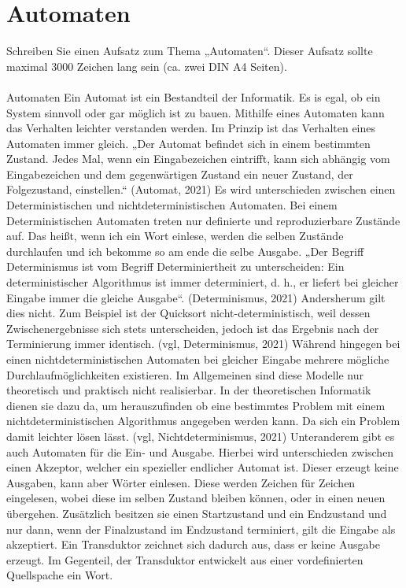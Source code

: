 \section{Automaten}
Schreiben Sie einen Aufsatz zum Thema „Automaten“. Dieser Aufsatz sollte maximal 3000 Zeichen lang sein (ca. zwei DIN A4 Seiten).\\
\\
Automaten
Ein Automat ist ein Bestandteil der Informatik. Es is egal, ob ein System sinnvoll oder gar möglich ist zu bauen. Mithilfe eines Automaten kann das Verhalten leichter verstanden werden. Im Prinzip ist das Verhalten eines Automaten immer gleich. „Der Automat befindet sich in einem bestimmten Zustand. Jedes Mal, wenn ein Eingabezeichen eintrifft, kann sich abhängig vom Eingabezeichen und dem gegenwärtigen Zustand ein neuer Zustand, der Folgezustand, einstellen.“ (Automat, 2021)
Es wird unterschieden zwischen einen Deterministischen und nichtdeterministischen Automaten. Bei einem  Deterministischen Automaten treten nur definierte und reproduzierbare Zustände auf. Das heißt, wenn ich ein Wort einlese, werden die selben Zustände durchlaufen und ich bekomme so am ende die selbe Ausgabe. „Der Begriff Determinismus ist vom Begriff Determiniertheit zu unterscheiden: Ein deterministischer Algorithmus ist immer determiniert, d. h., er liefert bei gleicher Eingabe immer die gleiche Ausgabe“. (Determinismus, 2021) Andersherum gilt dies nicht. Zum Beispiel ist der Quicksort nicht-deterministisch, weil dessen Zwischenergebnisse sich stets unterscheiden, jedoch ist das Ergebnis nach der Terminierung immer identisch. (vgl, Determinismus, 2021) 
Während hingegen bei einen nichtdeterministischen Automaten bei gleicher Eingabe mehrere mögliche Durchlaufmöglichkeiten existieren. Im Allgemeinen sind diese Modelle nur theoretisch und praktisch nicht realisierbar. In der theoretischen Informatik dienen sie dazu da, um herauszufinden ob eine bestimmtes Problem mit einem nichtdeterministischen Algorithmus angegeben werden kann. Da sich ein Problem damit leichter lösen lässt. (vgl, Nichtdeterminismus, 2021) 
Unteranderem gibt es auch Automaten für die Ein- und Ausgabe. Hierbei wird unterschieden zwischen einen Akzeptor, welcher ein spezieller endlicher Automat ist. Dieser erzeugt keine Ausgaben, kann aber Wörter einlesen. Diese werden Zeichen für Zeichen eingelesen, wobei diese im selben Zustand bleiben können, oder in einen neuen übergehen. Zusätzlich besitzen sie einen Startzustand und ein Endzustand und nur dann, wenn der Finalzustand im Endzustand terminiert, gilt die Eingabe als akzeptiert. Ein Transduktor zeichnet sich dadurch aus, dass er keine Ausgabe erzeugt. Im Gegenteil, der Transduktor entwickelt aus einer vordefinierten Quellspache ein Wort. 

